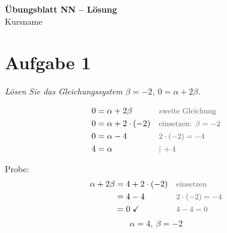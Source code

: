 \documentclass[a4paper,11pt]{article}
\newif\ifexplain
\newcommand{\blatttitel}[2]{\begin{center}{\Large\bfseries #1}\\[2pt]#2\end{center}}
\newcommand{\aufgabe}[1]{\section*{Aufgabe #1}}          %
\newcommand{\angabe}[1]{\textit{#1}\par\smallskip}
\newcommand{\why}[1]{\text{\small\color{black!65}#1}}   %
\newcommand{\explain}[1]{\ifexplain\begin{erklbox}#1\end{erklbox}\fi}
\begin{document}
\blatttitel{Übungsblatt NN -- \ifexplain Erklärung\else Lösung\fi}{Kursname}

\explain{Kurzer Überblick: Welche Themen kommen vor, welche Begriffe muss man kennen?}

\aufgabe{1}
\angabe{Lösen Sie das Gleichungssystem $\beta = -2$, $0 = \alpha + 2\beta$.}
\explain{Wir setzen den bekannten Wert für $\beta$ in die zweite Gleichung ein. Dann bleibt nur noch eine Unbekannte übrig.}
\begin{align*}
0 &= \alpha + 2\beta    && \why{zweite Gleichung}\\
0 &= \alpha + 2\cdot(-2) && \why{einsetzen: $\beta = -2$}\\
0 &= \alpha - 4          && \why{$2\cdot(-2) = -4$}\\
4 &= \alpha              && \why{$|\,+4$}
\end{align*}
\explain{Das „$|\,+4$“ heißt: Auf beiden Seiten wird $4$ addiert. Links steht dann $4$, rechts bleibt $\alpha$ allein.}
Probe:
\begin{align*}
\alpha + 2\beta &= 4 + 2\cdot(-2) && \why{einsetzen}\\
&= 4 - 4 && \why{$2\cdot(-2)=-4$}\\
&= 0 \;\checkmark && \why{$4 - 4 = 0$}
\end{align*}
\[\boxed{\alpha = 4,\ \beta = -2}\]
\end{document}
